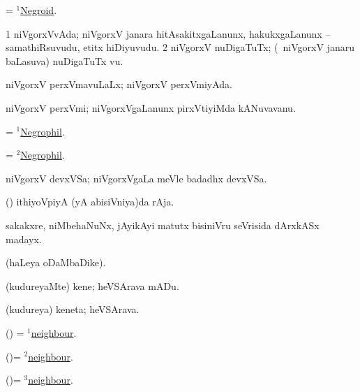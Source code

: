 \bentry
{}
\gl{\gu}
\bmng
= \hyperlink{Negroid(1)}{$^1$Negroid}. 
\emng
\eentry

\bentry
{}
\gl{\nA}
\bmng
\bnum
\num{1} niVgorxVvAda; niVgorxV janara hitAsakitxgaLanunx, hakukxgaLanunx -- samathiRsuvudu, etitx hiDiyuvudu. 
\num{2} niVgorxV nuDigaTuTx; (\kanmu\ niVgorxV janaru baLasuva) nuDigaTuTx \mo vu. 
\enum
\emng
\eentry

\bentry
{}
\gl{\gu}
\bmng
niVgorxV perxVmavuLaLx; niVgorxV perxVmiyAda. 
\emng
\eentry

\bentry
{}
\gl{\nA}
\bmng
niVgorxV perxVmi; niVgorxVgaLanunx pirxVtiyiMda kANuvavanu. 
\emng
\eentry

\bentry
{}
\gl{\gu}
\bmng
= \hyperlink{Negrophil(1)}{$^1$Negrophil}. 
\emng
\eentry

\bentry
{}
\gl{\nA}
\bmng
= \hyperlink{Negrophil(2)}{$^2$Negrophil}. 
\emng
\eentry

\bentry
{}
\gl{\nA}
\bmng
niVgorxV devxVSa; niVgorxVgaLa meVle badadhx devxVSa. 
\emng
\eentry

\bentry
{}
\gl{\nA}
\bmng
(\ca) ithiyoVpiyA (yA abisiVniya)da rAja. 
\emng
\eentry

\bentry
{}
\gl{\nA}
\bmng
sakakxre, niMbehaNuNx, jAyikAyi matutx bisiniVru seVrisida dArxkASx madayx. 
\emng
\eentry

\bentry
{}
\gl{\saMkiSx}
\bmng
{} (haLeya oDaMbaDike). 
\emng
\eentry

\bentry
{}
\gl{\akirx}
\bmng
(kudureyaMte) kene; heVSArava mADu. 
\emng
\eentry

\bentry
{}
\pron{}
\gl{\nA}
\bmng
(kudureya) keneta; heVSArava. 
\emng
\eentry

\bentry
{}
\pron{}
\gl{\nA}
\bmng
 (\ame) = \hyperlink{neighbour(1)}{$^1$neighbour}. 
\emng
\eentry

\bentry
{}
\gl{\gu}
\bmng
(\ame)= \hyperlink{neighbour(2)}{$^2$neighbour}. 
\emng
\eentry

\bentry
{}
\gl{\kirx}
\bmng
(\ame)= \hyperlink{neighbour(3)}{$^3$neighbour}. 
\emng
\eentry

